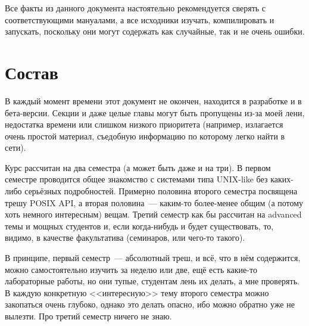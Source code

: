 Все факты из данного документа настоятельно рекомендуется сверять с соответствующими мануалами, а все исходники изучать, компилировать и запускать, поскольку они могут содержать как случайные, так и не очень ошибки.

\section*{Состав}
В каждый момент времени этот документ не окончен, находится в разработке и в бета-версии.
Секции и даже целые главы могут быть пропущены из-за моей лени, недостатка времени или слишком низкого приоритета (например, излагается очень простой материал, съедобную информацию по которому легко найти в сети).

Курс рассчитан на два семестра (а может быть даже и на три).
В первом семестре проводится общее знакомство с системами типа UNIX-like без каких-либо серьёзных подробностей.
Примерно половина второго семестра посвящена трешу POSIX API, а вторая половина~--- каким-то более-менее общим (а потому хоть немного интересным) вещам.
Третий семестр как бы рассчитан на advanced темы и мощных студентов и, если когда-нибудь и будет существовать, то, видимо, в качестве факультатива (семинаров, или чего-то такого).

В принципе, первый семестр~--- абсолютный треш, и всё, что в нём содержится, можно самостоятельно изучить за неделю или две, ещё есть какие-то лабораторные работы, но они тупые, студентам лень их делать, а мне проверять.
В каждую конкретную <<интересную>> тему второго семестра можно закопаться очень глубоко, однако это делать опасно, ибо можно обратно уже не вылезти.
Про третий семестр ничего не знаю.
